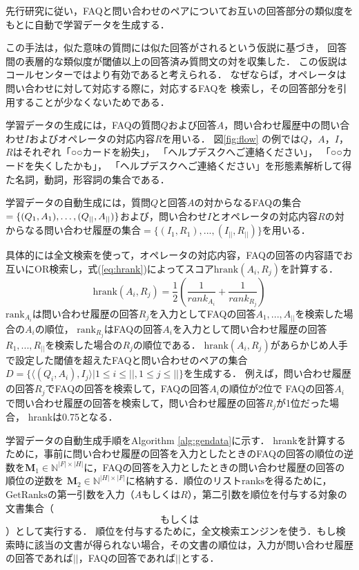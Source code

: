 \documentclass[japanese]{jnlp_1.4}
\newcommand{\FAQSet}{}
\newcommand{\HistorySet}{}
\begin{document}
先行研究\cite{jeon:05}に従い，FAQと問い合わせのペアについてお互いの回答部分の類似度をもとに自動で学習データを生成する．

この手法は，似た意味の質問には似た回答がされるという仮説に基づき，
回答間の表層的な類似度が閾値以上の回答済み質問文の対を収集した．
この仮説はコールセンターではより有効であると考えられる．
なぜならば，オペレータは問い合わせに対して対応する際に，対応するFAQを
検索し，その回答部分を引用することが少なくないためである．

学習データの生成には，FAQの質問$Q$および回答$A$，問い合わせ履歴中の問い合わせ$I$およびオペレータの対応内容$R$を用いる．
  図\ref{fig:flow}
  の例では$Q$，$A$，$I$，$R$はそれぞれ「○○カードを紛失」，
  「ヘルプデスクへご連絡ください」，
  「○○カードを失くしたかも」，
  「ヘルプデスクへご連絡ください」を形態素解析して得た名詞，動詞，形容詞の集合である．

学習データの自動生成には，質問$Q$と回答$A$の対からなるFAQの集合$\FAQSet = \{(Q_1, A_1), \ldots, \linebreak
(Q_{|\FAQSet|}, A_{|\FAQSet|})\}$および，問い合わせ$I$とオペレータの対応内容$R$の対からなる問い合わせ履歴の集合$\HistorySet = \{(I_1, R_1), ..., (I_{|\HistorySet|}, R_{|\HistorySet|})\}$を用いる．

具体的には全文検索を使って，オペレータの対応内容，FAQの回答の内容語でお互いにOR検索し，式(\ref{eq:hrank})によってスコア$\textrm{hrank}(A_{i}, R_{j})$を計算する．
\begin{equation}
  \textrm{hrank}(A_{i}, R_{j}) = \frac{1}{2} \left(\frac{1}{rank_{A_{i}}} + \frac{1}{rank_{R_{j}}}\right)
	\label{eq:hrank}
\end{equation}
$\textrm{rank}_{A_{i}}$は問い合わせ履歴の回答$R_{j}$を入力としてFAQの回答$A_1, ..., A_{|\FAQSet|}$を検索した場合の$A_{i}$の順位，
$\textrm{rank}_{R_{j}}$はFAQの回答$A_{i}$を入力として問い合わせ履歴の回答$R_1, ..., R_{|\HistorySet|}$を検索した場合の$R_{j}$の順位である．
$\textrm{hrank}(A_{i}, R_{j})$があらかじめ人手で設定した閾値を超えたFAQと問い合わせのペアの集合
$D=\{\langle (Q_i, A_i), I_j\rangle|1 \leq i \leq |\FAQSet|, 1 \leq j \leq |\HistorySet|\}$を生成する．
例えば，問い合わせ履歴の回答$R_j$でFAQの回答を検索して，FAQの回答$A_i$の順位が2位で
FAQの回答$A_i$で問い合わせ履歴の回答を検索して，問い合わせ履歴の回答$R_j$が1位だった場合，
hrankは0.75となる．

学習データの自動生成手順をAlgorithm \ref{alg:gendata}に示す．
hrankを計算するために，事前に問い合わせ履歴の回答を入力としたときのFAQの回答の順位の逆数を$\mathbf{M}_1 \in \mathbb{N}^{|F|\times|H|}$に，FAQの回答を入力としたときの問い合わせ履歴の回答の順位の逆数を
$\mathbf{M}_2 \in \mathbb{N}^{|H|\times|F|}$に格納する．順位のリスト$\textrm{ranks}$を得るために，$\textrm{GetRanks}$の第一引数を入力（$A$もしくは$R$），第二引数を順位を付与する対象の文書集合（$\FAQSet$もしくは$\HistorySet$）として実行する．
順位を付与するために，全文検索エンジンを使う．もし検索時に該当の文書が得られない場合，その文書の順位は，入力が問い合わせ履歴の回答であれば$|\FAQSet|$，FAQの回答であれば$|\HistorySet|$とする．
\end{document}
